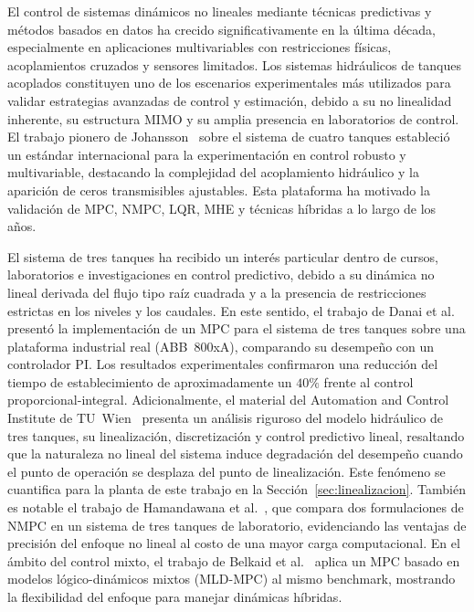 \documentclass[12pt,letterpaper]{article}
\begin{document}
El control de sistemas dinámicos no lineales mediante técnicas predictivas y métodos
basados en datos ha crecido significativamente en la última década, especialmente en
aplicaciones multivariables con restricciones físicas, acoplamientos cruzados y
sensores limitados. Los sistemas hidráulicos de tanques acoplados constituyen uno de
los escenarios experimentales más utilizados para validar estrategias avanzadas de
control y estimación, debido a su no linealidad inherente, su estructura MIMO y su
amplia presencia en laboratorios de control. El trabajo pionero de
Johansson~\cite{johansson2000} sobre el sistema de cuatro tanques estableció un
estándar internacional para la experimentación en control robusto y multivariable,
destacando la complejidad del acoplamiento hidráulico y la aparición de ceros
transmisibles ajustables. Esta plataforma ha motivado la validación de MPC, NMPC,
LQR, MHE y técnicas híbridas a lo largo de los años.

El sistema de tres tanques ha recibido un interés particular dentro de cursos,
laboratorios e investigaciones en control predictivo, debido a su dinámica no lineal
derivada del flujo tipo raíz cuadrada y a la presencia de restricciones estrictas en
los niveles y los caudales. En este sentido, el trabajo de
Danai et al.~\cite{danai2022} presentó la implementación de un MPC para el sistema
de tres tanques sobre una plataforma industrial real (ABB~800xA), comparando su
desempeño con un controlador PI. Los resultados experimentales confirmaron una
reducción del tiempo de establecimiento de aproximadamente un $40\%$ frente al
control proporcional-integral. Adicionalmente, el material del Automation and
Control Institute de TU~Wien~\cite{tuwien2025} presenta un análisis riguroso del
modelo hidráulico de tres tanques, su linealización, discretización y control
predictivo lineal, resaltando que la naturaleza no lineal del sistema induce
degradación del desempeño cuando el punto de operación se desplaza del punto de
linealización. Este fenómeno se cuantifica para la planta de este trabajo en la
Sección~\ref{sec:linealizacion}. También es notable el trabajo de
Hamandawana et al.~\cite{hamandawana2017}, que compara dos formulaciones de NMPC en
un sistema de tres tanques de laboratorio, evidenciando las ventajas de precisión del
enfoque no lineal al costo de una mayor carga computacional. En el ámbito del control
mixto, el trabajo de Belkaid et al.~\cite{belkaid2023} aplica un MPC basado en
modelos lógico-dinámicos mixtos (MLD-MPC) al mismo benchmark, mostrando la
flexibilidad del enfoque para manejar dinámicas híbridas.
\end{document}
